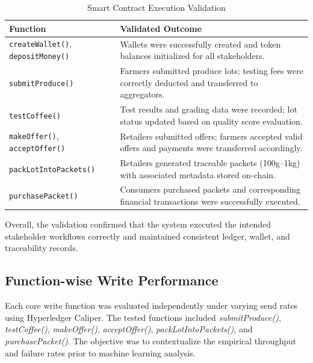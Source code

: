 \documentclass[12pt]{article}
\begin{document}
	\begin{table}[ht]
		\centering
		\caption{Smart Contract Execution Validation}
		\label{tab:smartcontract-validation}
		\renewcommand{\arraystretch}{1.3}
		\begin{tabular}{|p{4cm}|p{9cm}|}
			\hline
			\textbf{Function} & \textbf{Validated Outcome} \\
			\hline
			\texttt{createWallet()}, \texttt{depositMoney()}  & Wallets were successfully created and token balances initialized for all stakeholders. \\
			\hline
			\texttt{submitProduce()} & Farmers submitted produce lots; testing fees were correctly deducted and transferred to aggregators. \\
			\hline
			\texttt{testCoffee()}  & Test results and grading data were recorded; lot status updated based on quality score evaluation. \\
			\hline
			\texttt{makeOffer()}, \texttt{acceptOffer()} & Retailers submitted offers; farmers accepted valid offers and payments were transferred accordingly. \\
			\hline
			\texttt{packLotIntoPackets()} & Retailers generated traceable packets (100g–1kg) with associated metadata stored on-chain. \\
			\hline
			\texttt{purchasePacket()} & Consumers purchased packets and corresponding financial transactions were successfully executed. \\
			\hline
		\end{tabular}
	\end{table}
	

	
Overall, the validation confirmed that the system executed the intended stakeholder workflows correctly and maintained consistent ledger, wallet, and traceability records.
	
	
	
	
	

\subsection{Function-wise Write Performance}

Each core write function was evaluated independently under varying send rates using Hyperledger Caliper. The tested functions included \textit{submitProduce()}, \textit{testCoffee()}, \textit{makeOffer()}, \textit{acceptOffer()}, \textit{packLotIntoPackets()}, and \textit{purchasePacket()}. The objective was to contextualize the empirical throughput and failure rates prior to machine learning analysis.
\end{document}

